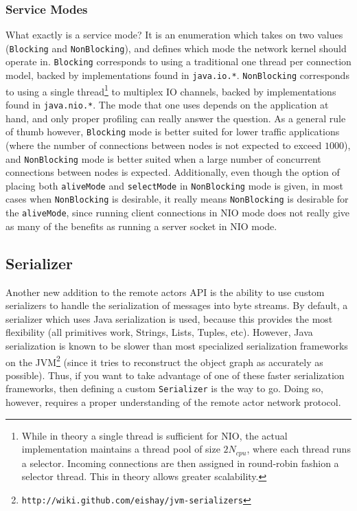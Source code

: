 \documentclass{article}
\begin{document}
\subsubsection{Service Modes}
What exactly is a service mode? It is an enumeration which takes on two values (\verb|Blocking| and \verb|NonBlocking|),
and defines which mode the network kernel should operate in. \verb|Blocking| corresponds to 
using a traditional one thread per connection model, backed by implementations found in 
\verb|java.io.*|. \verb|NonBlocking| corresponds to using a single thread\footnote{
  While in theory a single thread is sufficient for NIO, the actual implementation
  maintains a thread pool of size $2N_{cpu}$, where each thread runs a selector. Incoming
  connections are then assigned in round-robin fashion a selector thread. This in theory
  allows greater scalability. %
}
to multiplex IO channels, backed by implementations found in \verb|java.nio.*|. The mode that
one uses depends on the application at hand, and only proper profiling can really answer the
question. As a general rule of thumb however, \verb|Blocking| mode is better suited for 
lower traffic applications (where the number of connections between nodes is not expected
to exceed $1000$), and \verb|NonBlocking| mode is better suited when a large number of
concurrent connections between nodes is expected. Additionally, even though the option of placing
both \verb|aliveMode| and \verb|selectMode| in \verb|NonBlocking| mode is given, in most 
cases when \verb|NonBlocking| is desirable, it really means \verb|NonBlocking| is desirable for
the \verb|aliveMode|, since running client connections in NIO mode does not really give as many
of the benefits as running a server socket in NIO mode.

\subsection{Serializer}
Another new addition to the remote actors API is the ability to use custom serializers
to handle the serialization of messages into byte streams. By default, a serializer which
uses Java serialization is used, because this provides the most flexibility (all primitives work,
Strings, Lists, Tuples, etc). However, Java serialization is known to be slower than most
specialized serialization frameworks on the JVM\footnote{\texttt{http://wiki.github.com/eishay/jvm-serializers}}
(since it tries to reconstruct the object graph as accurately as possible). Thus, if you want
to take advantage of one of these faster serialization frameworks, then defining a
custom \verb|Serializer| is the way to go. Doing so, however, requires a proper understanding
of the remote actor network protocol.
\end{document}
